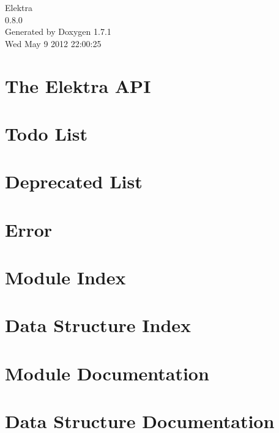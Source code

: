 \documentclass[a4paper]{book}
\begin{document}
\hypersetup{pageanchor=false}
\begin{titlepage}
\vspace*{7cm}
\begin{center}
{\Large Elektra \\[1ex]\large 0.8.0 }\\
\vspace*{1cm}
{\large Generated by Doxygen 1.7.1}\\
\vspace*{0.5cm}
{\small Wed May 9 2012 22:00:25}\\
\end{center}
\end{titlepage}
\clearemptydoublepage
{}
\tableofcontents
\clearemptydoublepage
{}
\hypersetup{pageanchor=true}
\chapter{The Elektra API}
\label{index}\hypertarget{index}{}
\chapter{Todo List}
\label{todo}
\hypertarget{todo}{}

\chapter{Deprecated List}
\label{deprecated}
\hypertarget{deprecated}{}

\chapter{Error}
\label{err}
\hypertarget{err}{}

\chapter{Module Index}

\chapter{Data Structure Index}

\chapter{Module Documentation}













\chapter{Data Structure Documentation}







\printindex
\end{document}
